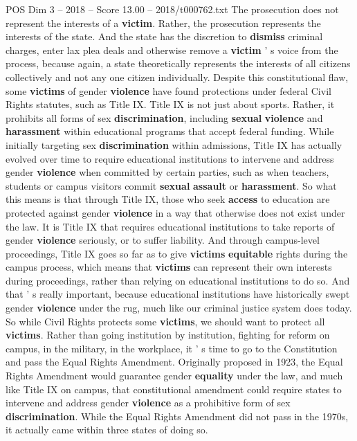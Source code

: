 \begin{textsample}{POS Dim 3 – 2018 – Score 13.00 – 2018/t000762.txt}
The prosecution does not represent the interests of a \textbf{victim}.
Rather, the prosecution represents the interests of the state.
And the state has the discretion to \textbf{dismiss} criminal charges, enter lax plea deals and otherwise remove a \textbf{victim} ' s voice from the process, because again, a state theoretically represents the interests of all citizens collectively and not any one citizen individually.
Despite this constitutional flaw, some \textbf{victims} of gender \textbf{violence} have found protections under federal Civil Rights statutes, such as Title IX.
Title IX is not just about sports.
Rather, it prohibits all forms of sex \textbf{discrimination}, including \textbf{sexual} \textbf{violence} and \textbf{harassment} within educational programs that accept federal funding.
While initially targeting sex \textbf{discrimination} within admissions, Title IX has actually evolved over time to require educational institutions to intervene and address gender \textbf{violence} when committed by certain parties, such as when teachers, students or campus visitors commit \textbf{sexual} \textbf{assault} or \textbf{harassment}.
So what this means is that through Title IX, those who seek \textbf{access} to education are protected against gender \textbf{violence} in a way that otherwise does not exist under the law.
It is Title IX that requires educational institutions to take reports of gender \textbf{violence} seriously, or to suffer liability.
And through campus-level proceedings, Title IX goes so far as to give \textbf{victims} \textbf{equitable} rights during the campus process, which means that \textbf{victims} can represent their own interests during proceedings, rather than relying on educational institutions to do so.
And that ' s really important, because educational institutions have historically swept gender \textbf{violence} under the rug, much like our criminal justice system does today.
So while Civil Rights protects some \textbf{victims}, we should want to protect all \textbf{victims}.
Rather than going institution by institution, fighting for reform on campus, in the military, in the workplace, it ' s time to go to the Constitution and pass the Equal Rights Amendment.
Originally proposed in 1923, the Equal Rights Amendment would guarantee gender \textbf{equality} under the law, and much like Title IX on campus, that constitutional amendment could require states to intervene and address gender \textbf{violence} as a prohibitive form of sex \textbf{discrimination}.
While the Equal Rights Amendment did not pass in the 1970s, it actually came within three states of doing so.

\end{textsample}
